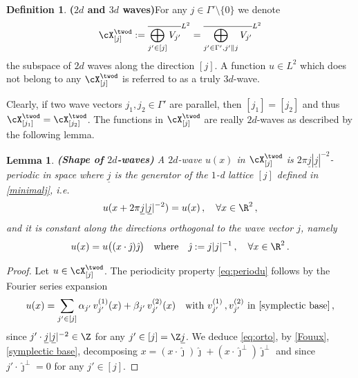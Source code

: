 \documentclass[11pt,a4paper,reqno]{article}
\numberwithin{equation}{section}
\newtheorem{lemma}[theorem]{Lemma}
\theoremstyle{definition}
\newtheorem{definition}[theorem]{Definition}
\begin{document}
\begin{definition}{\bf ($2d$ and $3d$ waves)}\label{def:cX2d}
For any  $j \in\Gamma'\setminus\{0\} $  
we denote
$$
    \cX_{[j]}^{\twod}:=\overline{\bigoplus_{j' \in [j]} V_{j'}}^{L^2}=\overline{\bigoplus_{j' \in \Gamma', j'\parallel j} V_{j'}}^{L^2}
$$
the subspace of $ 2 d$ waves along the direction $[j ]$.  
A function $ u \in L^2  $ 
which does not belong to any
$ \cX_{[j]}^{\twod} $  
is referred to as a truly $ 3d$-wave. 
\end{definition}


Clearly, if two wave vectors $ j_1, j_2 \in  \Gamma' $ 
    are parallel, then $[j_1]=[j_2]$ and thus 
   $ \cX_{[j_1]}^{\twod} = \cX_{[j_2]}^{\twod} $.
The functions in $ \cX_{[j]}^{\twod}$ are really $ 2 d$-waves as described by the following lemma. 

\begin{lemma}\label{lm:2d-Waves}
{\bf (Shape of $2d$-waves)}
A $ 2 d$-wave $ u (x)   $ in $ \cX_{[j]}^{\twod}$ is
$ 2 \pi \underline j | \underline j|^{-2}$-periodic in space where $\underline j $
is the generator of the $1$-d lattice  $[j] $ defined in 
\eqref{minimalj}, i.e.
\begin{equation}\label{eq:periodu}
u (x + 2 \pi \underline j | \underline j|^{-2} ) = u (x)  \, ,
\quad \forall x \in \R^2 \, , 
\end{equation}
and it is constant along the directions orthogonal to the wave vector $ j $, namely
\begin{equation}\label{eq:orto}
u(x) = u \big( 
(x \cdot \hat\jmath )  \hat\jmath \big)  \quad \text{where} \quad  
\hat\jmath := j |j|^{-1} \, , 
\quad \forall x \in \R^2 \, . 
\end{equation}
\end{lemma}

\begin{proof}
Let $ u   \in \cX_{[j]}^{\twod}$. 
The periodicity property \eqref{eq:periodu} follows by  the Fourier series expansion   
\begin{equation}\label{Fouux}
        u(x)=\sum_{j' \in [j]} \alpha_{j'}\, v_{j'}^{(1)}(x) +\beta_{j'}\, v_{j'}^{(2)} (x) \quad \text{with} \ 
        v_{j'}^{(1)} \, , v_{j'}^{(2)} 
        \ \text{in} \ 
        \eqref{symplectic base} \, , 
\end{equation}
since 
$ j' \cdot \underline j | \underline j|^{-2} \in \Z $ for any $ j' \in [j] = \Z \underline j  $.  We deduce 
\eqref{eq:orto}, by \eqref{Fouux},  \eqref{symplectic base}, decomposing $ x = (x \cdot \hat\jmath) \hat\jmath + 
(x \cdot \hat\jmath^\bot) \hat\jmath^\bot $  and since  $j' \cdot \hat\jmath^\bot = 0 $ for 
any $j' \in [j] $. 
\end{proof}
\end{document}
